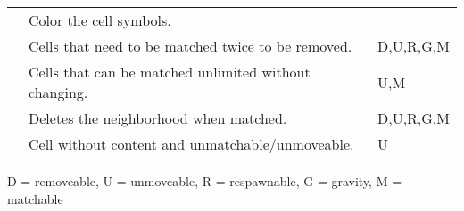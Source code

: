 \documentclass[12pt, a4paper, footexclude, headexclude]{scrartcl}
\begin{document}
\begin{Form}
        \begin{center}
            \begin{tabularx}{\textwidth}{@{} s X t @{}}
                 &%
                Color the cell symbols.&%
                \\%
                 &%
                Cells that need to be matched twice to be removed. &%
                D,U,R,G,M\\%
                 &%
                Cells that can be matched unlimited without changing. &%
                U,M\\%
                 &%
                Deletes the neighborhood when matched. &%
                D,U,R,G,M\\%
                 &%
                Cell without content and unmatchable/unmoveable. &
                U%
            \end{tabularx}
        \end{center}

        D = removeable, U = unmoveable, R = respawnable, G = gravity, M = matchable

        \TextField[bordercolor=white, name=tooltiptxt, readonly]{}
    \end{Form}
\end{document}
